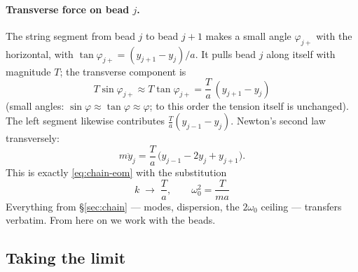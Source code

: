 \documentclass[11pt]{article}
\theoremstyle{plain}
\theoremstyle{definition}
\theoremstyle{remark}
\begin{document}
\paragraph{Transverse force on bead $j$.}
The string segment from bead $j$ to bead $j+1$ makes a small angle
$\varphi_{j+}$ with the horizontal, with
$\tan\varphi_{j+} = (y_{j+1}-y_j)/a$. It pulls bead $j$ along itself with
magnitude $T$; the transverse component is
\begin{equation}
  T\sin\varphi_{j+} \approx T\tan\varphi_{j+}
  = \frac{T}{a}\,(y_{j+1}-y_j)
\end{equation}
(small angles: $\sin\varphi \approx \tan\varphi \approx \varphi$; to this
order the tension itself is unchanged). The left segment likewise
contributes $\frac{T}{a}(y_{j-1}-y_j)$. Newton's second law transversely:
\begin{equation}
  m\ddot y_j = \frac{T}{a}\,\bigl(y_{j-1} - 2y_j + y_{j+1}\bigr).
  \label{eq:bead-eom}
\end{equation}
This is exactly \eqref{eq:chain-eom} with the substitution
\begin{equation}
  \boxed{\;k \;\longrightarrow\; \frac{T}{a},
  \qquad
  \omega_0^2 = \frac{T}{ma}\;}
\end{equation}
Everything from \S\ref{sec:chain} --- modes, dispersion, the $2\omega_0$
ceiling --- transfers verbatim. From here on we work with the beads.

\subsection{Taking the limit}
\label{sec:the-limit}
\end{document}

